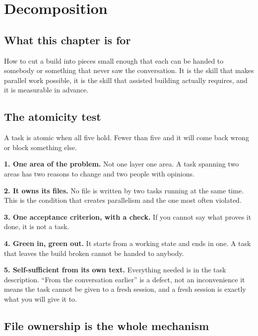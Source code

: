 \chapter{Decomposition}
\label{ch:decomposition}

\section*{What this chapter is for}

How to cut a build into pieces small enough that each can be handed to somebody
\dash{} or something \dash{} that never saw the conversation. It is the skill
that makes parallel work possible, it is the skill that assisted building
actually requires, and it is measurable in advance.

\section{The atomicity test}

A task is atomic when all five hold. Fewer than five and it will come back
wrong or block something else.

\begin{kitmethod}
\textbf{1. One area of the problem.} Not one layer \dash{} one area. A task
spanning two areas has two reasons to change and two people with opinions.

\textbf{2. It owns its files.} No file is written by two tasks running at the
same time. This is the condition that creates parallelism and the one most
often violated.

\textbf{3. One acceptance criterion, with a check.} If you cannot say what
proves it done, it is not a task.

\textbf{4. Green in, green out.} It starts from a working state and ends in
one. A task that leaves the build broken cannot be handed to anybody.

\textbf{5. Self-sufficient from its own text.} Everything needed is in the
task description. ``From the conversation earlier'' is a defect, not an
inconvenience \dash{} it means the task cannot be given to a fresh session, and
a fresh session is exactly what you will give it to.
\end{kitmethod}

\section{File ownership is the whole mechanism}

